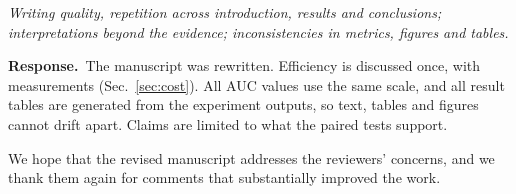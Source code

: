 \documentclass[11pt]{article}
\newenvironment{comment}{\par\medskip\noindent\begin{minipage}{\linewidth}\color{black!70}\itshape}{\end{minipage}\par\smallskip}
\newcommand{\resp}{\noindent\textbf{Response.}~}
\begin{document}
\begin{comment}
Writing quality, repetition across introduction, results and conclusions; interpretations beyond the evidence; inconsistencies in metrics, figures and tables.
\end{comment}
\resp The manuscript was rewritten. Efficiency is discussed once, with measurements (Sec.~\ref{sec:cost}). All AUC values use the same scale, and all result tables are generated from the experiment outputs, so text, tables and figures cannot drift apart. Claims are limited to what the paired tests support.

\bigskip
\noindent We hope that the revised manuscript addresses the reviewers' concerns, and we thank them again for comments that substantially improved the work.
\end{document}
